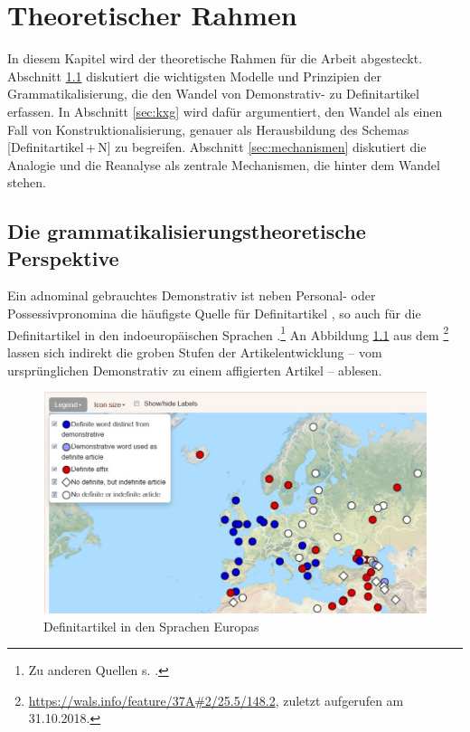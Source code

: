 \chapter{Theoretischer Rahmen} \label{chapter:theorie}

In diesem Kapitel wird der theoretische Rahmen für die Arbeit abgesteckt. 
Abschnitt \ref{sec:gram} diskutiert die wichtigsten Modelle und Prinzipien  der Grammatikalisierung, die den Wandel von Demonstrativ- zu Definitartikel erfassen. In Abschnitt \ref{sec:kxg} wird dafür argumentiert, den Wandel als einen Fall von Konstruktionalisierung, genauer als Herausbildung des Schemas [Definitartikel\,+\,N] zu begreifen. Abschnitt \ref{sec:mechanismen} diskutiert die Analogie und die Reanalyse als zentrale Mechanismen, die hinter dem Wandel stehen.  

\section{Die grammatikalisierungstheoretische Perspektive}\label{sec:gram}

Ein adnominal gebrauchtes Demonstrativ ist neben Personal- oder Possessivpronomina die häufigste Quelle für Definitartikel \parencites()(){Himmelmann1997}[215]{Heine2002}, so auch für die Definitartikel in den indoeuropäischen Sprachen \parencite{vonHeusinger2013}.\footnote{Zu anderen Quellen s. \textcites()()[][839]{Himmelmann2001}[523]{deMulder2011}.}
An Abbildung \ref{wals} aus dem \footnote{\url{https://wals.info/feature/37A\#2/25.5/148.2}, zuletzt aufgerufen am 31.10.2018.} lassen sich  indirekt die groben Stufen der Artikelentwicklung -- vom ursprünglichen Demonstrativ zu einem affigierten Artikel -- ablesen. 

\begin{figure}
\begin{center}
  \includegraphics[width=\textwidth]{images/wals.jpg}
\caption {Definitartikel in den Sprachen Europas \parencite{Dryer2013}}
\label{wals}
\end{center}
\end{figure} 

